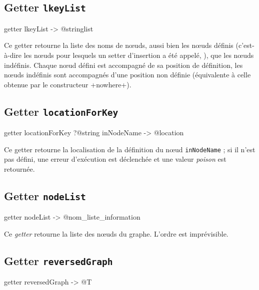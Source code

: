\subsection{Getter \texttt{lkeyList}}

\begin{galgas3}
getter lkeyList -> @stringlist
\end{galgas3}

Ce getter retourne la liste des noms de nœuds, aussi bien les nœuds définis (c'est-à-dire les nœuds pour lesquels un setter d'insertion a été appelé, ), que les nœuds indéfinis. Chaque nœud défini est accompagné de sa position de définition, les nœuds indéfinis sont accompagnés d'une position non définie (équivalente à celle obtenue par le constructeur \ggst+nowhere+).






\subsection{Getter \texttt{locationForKey}}

\begin{galgas3}
getter locationForKey ?@string inNodeName -> @location
\end{galgas3}

Ce getter retourne la localisation de la définition du nœud \texttt{inNodeName} ; si il n'est pas défini, une erreur d'exécution est déclenchée et une valeur \emph{poison} est retournée.


\subsection{Getter \texttt{nodeList}}

\begin{galgas3}
getter nodeList -> @nom_liste_information
\end{galgas3}

Ce \emph{getter} retourne la liste des nœuds du graphe. L'ordre est imprévisible.




\subsection{Getter \texttt{reversedGraph}}

\begin{galgas3}
getter reversedGraph -> @T
\end{galgas3}


